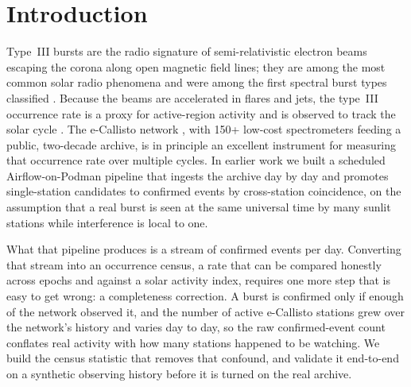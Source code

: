 \documentclass[twocolumn]{aastex631}
\begin{document}
\section{Introduction}
Type~III bursts are the radio signature of semi-relativistic electron beams escaping the corona along
open magnetic field lines; they are among the most common solar radio phenomena and were among the
first spectral burst types classified \citep{wildmccready1950,reid2014}. Because the beams are
accelerated in flares and jets, the type~III occurrence rate is a proxy for active-region activity and
is observed to track the solar cycle \citep{sainthilaire2013}. The e-Callisto network \citep{benz2009},
with 150+ low-cost spectrometers feeding a public, two-decade archive, is in principle an excellent
instrument for measuring that occurrence rate over multiple cycles. In earlier work we built a
scheduled Airflow-on-Podman pipeline that ingests the archive day by day and promotes single-station
candidates to confirmed events by cross-station coincidence, on the assumption that a real burst is seen at the
same universal time by many sunlit stations while interference is local to one.

What that pipeline produces is a stream of confirmed events per day. Converting that stream into an
occurrence census, a rate that can be compared honestly across epochs and against a solar activity
index, requires one more step that is easy to get wrong: a completeness correction. A burst is
confirmed only if enough of the network observed it, and the number of active e-Callisto stations
grew over the network's history and varies day to day, so the raw confirmed-event count conflates
real activity with how many stations happened to be watching. We build the census statistic that
removes that confound, and validate it end-to-end on a synthetic observing history before it is
turned on the real archive.
\end{document}
